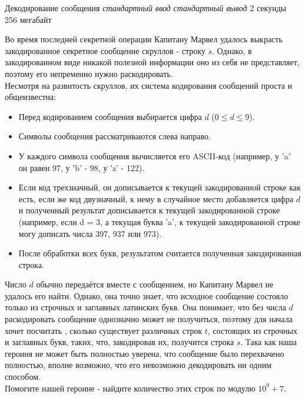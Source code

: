 \begin{problem}%
{Декодирование сообщения}%
{\textsl{стандартный ввод}}%
{\textsl{стандартный вывод}}%
{2 секунды}%
{256 мегабайт}{}

Во время последней секретной операции Капитану Марвел удалось выкрасть закодированное секретное сообщение скруллов - строку $s$. Однако, в закодированном виде никакой полезной информации оно из себя не представляет, поэтому его непременно нужно раскодировать.\\

Несмотря на развитость скруллов, их система кодирования сообщений проста и общеизвестна:

\begin{itemize}
    \item Перед кодированием сообщения выбирается цифра $d$ ($0 \le d \le 9$).
    \item Символы сообщения рассматриваются слева направо.
    \item У каждого символа сообщения вычисляется его ASCII-код (например, у 'a' он равен 97, у 'b' - 98, у 'z' - 122).
    \item Если код трехзначный, он дописывается к текущей закодированной строке как есть, если же код двузначный, к нему в случайное место добавляется цифра $d$ и полученный результат дописывается к текущей закодированной строке (например, если d = 3, а текущая буква 'a', к текущей закодированной строке могу дописать числа 397, 937 или 973).
    \item После обработки всех букв, результатом считается полученная закодированная строка.
\end{itemize}

Число $d$ обычно передаётся вместе с сообщением, но Капитану Марвел не удалось его найти. Однако, она точно знает, что исходное сообщение состояло только из строчных и заглавных латинских букв. Она понимает, что без числа $d$ раскодировать сообщение однозначно может не получиться, поэтому для начала хочет посчитать , сколько существует различных строк $t$, состоящих из строчных и заглавных букв, таких, что, закодировав их, получится строка $s$. Така как наша героиня не может быть полностью уверена, что сообщение было перехвачено полностью, вполне возможно, что его невозможно декодировать ни одним способом.\\

Помогите нашей героине - найдите количество этих строк по модулю $10^9 + 7$.

\InputFile


\end{problem}
